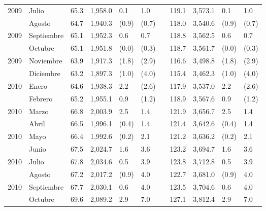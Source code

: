 \begin{center}
\begin{longtable}{llp{1.1cm}p{1.2cm}p{1.2cm}p{1.2cm}rp{1.2cm}p{1.2cm}p{1.2cm}p{1.2cm}}
		\multicolumn{1}{l}{	2009	}&	Julio	&	 65.3 	&	 1,958.0 	&	 0.1 	&	 1.0 	&  &	 119.1 	&	 3,573.1 	&	 0.1 	&	 1.0 	\\
		\rowcolor{color1!5!white}\multicolumn{1}{l}{	2009	}&	Agosto	&	 64.7 	&	 1,940.3 	&	 (0.9)	&	 (0.7)	&  &	 118.0 	&	 3,540.6 	&	 (0.9)	&	 (0.7)	\\
		\multicolumn{1}{l}{	2009	}&	Septiembre	&	 65.1 	&	 1,952.3 	&	 0.6 	&	 0.7 	&  &	 118.8 	&	 3,562.5 	&	 0.6 	&	 0.7 	\\
		\rowcolor{color1!5!white}\multicolumn{1}{l}{	2009	}&	Octubre	&	 65.1 	&	 1,951.8 	&	 (0.0)	&	 (0.3)	&  &	 118.7 	&	 3,561.7 	&	 (0.0)	&	 (0.3)	\\
		\multicolumn{1}{l}{	2009	}&	Noviembre	&	 63.9 	&	 1,917.3 	&	 (1.8)	&	 (2.9)	&  &	 116.6 	&	 3,498.8 	&	 (1.8)	&	 (2.9)	\\
		\rowcolor{color1!5!white}\multicolumn{1}{l}{	2009	}&	Diciembre	&	 63.2 	&	 1,897.3 	&	 (1.0)	&	 (4.0)	&  &	 115.4 	&	 3,462.3 	&	 (1.0)	&	 (4.0)	\\
		\multicolumn{1}{l}{	2010	}&	Enero	&	 64.6 	&	 1,938.3 	&	 2.2 	&	 (2.6)	&  &	 117.9 	&	 3,537.0 	&	 2.2 	&	 (2.6)	\\
		\rowcolor{color1!5!white}\multicolumn{1}{l}{	2010	}&	Febrero	&	 65.2 	&	 1,955.1 	&	 0.9 	&	 (1.2)	&  &	 118.9 	&	 3,567.6 	&	 0.9 	&	 (1.2)	\\
		\multicolumn{1}{l}{	2010	}&	Marzo	&	 66.8 	&	 2,003.9 	&	 2.5 	&	 1.4 	&  &	 121.9 	&	 3,656.7 	&	 2.5 	&	 1.4 	\\
		\rowcolor{color1!5!white}\multicolumn{1}{l}{	2010	}&	Abril	&	 66.5 	&	 1,996.1 	&	 (0.4)	&	 1.4 	&  &	 121.4 	&	 3,642.6 	&	 (0.4)	&	 1.4 	\\
		\multicolumn{1}{l}{	2010	}&	Mayo	&	 66.4 	&	 1,992.6 	&	 (0.2)	&	 2.1 	&  &	 121.2 	&	 3,636.2 	&	 (0.2)	&	 2.1 	\\
		\rowcolor{color1!5!white}\multicolumn{1}{l}{	2010	}&	Junio	&	 67.5 	&	 2,024.7 	&	 1.6 	&	 3.6 	&  &	 123.2 	&	 3,694.7 	&	 1.6 	&	 3.6 	\\
		\multicolumn{1}{l}{	2010	}&	Julio	&	 67.8 	&	 2,034.6 	&	 0.5 	&	 3.9 	&  &	 123.8 	&	 3,712.8 	&	 0.5 	&	 3.9 	\\
		\rowcolor{color1!5!white}\multicolumn{1}{l}{	2010	}&	Agosto	&	 67.2 	&	 2,017.2 	&	 (0.9)	&	 4.0 	&  &	 122.7 	&	 3,681.0 	&	 (0.9)	&	 4.0 	\\
		\multicolumn{1}{l}{	2010	}&	Septiembre	&	 67.7 	&	 2,030.1 	&	 0.6 	&	 4.0 	&  &	 123.5 	&	 3,704.6 	&	 0.6 	&	 4.0 	\\
		\rowcolor{color1!5!white}\multicolumn{1}{l}{	2010	}&	Octubre	&	 69.6 	&	 2,089.2 	&	 2.9 	&	 7.0 	&  &	 127.1 	&	 3,812.4 	&	 2.9 	&	 7.0 	\\

\end{longtable}
\end{center}
